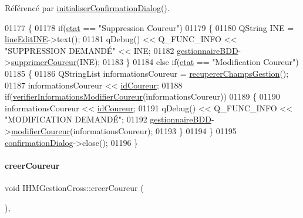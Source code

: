 Référencé par \hyperlink{class_i_h_m_gestion_cross_a1d3c7f83d4c960f38b237499d2a89731}{initialiser\+Confirmation\+Dialog()}.


\begin{DoxyCode}
01177 \{
01178     \textcolor{keywordflow}{if}(\hyperlink{class_i_h_m_gestion_cross_a5da4390d71dbd5d05cff339f93c7c85a}{etat} == \textcolor{stringliteral}{"Suppression Coureur"})
01179     \{
01180         QString INE = \hyperlink{class_i_h_m_gestion_cross_ab6c32fd079f81c4fa0b9ec0b4ef9bb61}{lineEditINE}->text();
01181         qDebug() << Q\_FUNC\_INFO << \textcolor{stringliteral}{"SUPPRESSION DEMANDÉ"} << INE;
01182         \hyperlink{class_i_h_m_gestion_cross_a440bac63a3e51db3e2c08e883f8cafc9}{gestionnaireBDD}->\hyperlink{class_gestion_b_d_d_afe47ec92274b7998131c5d4e6551d177}{supprimerCoureur}(INE);
01183     \}
01184     \textcolor{keywordflow}{else} \textcolor{keywordflow}{if}(\hyperlink{class_i_h_m_gestion_cross_a5da4390d71dbd5d05cff339f93c7c85a}{etat} == \textcolor{stringliteral}{"Modification Coureur"})
01185     \{
01186         QStringList informationsCoureur = \hyperlink{class_i_h_m_gestion_cross_a271efe8d31fbe05fccfb2dc81e71971a}{recupererChampsGestion}();
01187         informationsCoureur << \hyperlink{class_i_h_m_gestion_cross_a9352a649126c14e7d0da3694c10c3cef}{idCoureur};
01188         \textcolor{keywordflow}{if}(\hyperlink{class_i_h_m_gestion_cross_a0e088653019d8adefb371348f272d2e2}{verifierInformationsModifierCoureur}(informationsCoureur))
01189         \{
01190             informationsCoureur << \hyperlink{class_i_h_m_gestion_cross_a9352a649126c14e7d0da3694c10c3cef}{idCoureur};
01191             qDebug() << Q\_FUNC\_INFO << \textcolor{stringliteral}{"MODIFICATION DEMANDÉ"};
01192             \hyperlink{class_i_h_m_gestion_cross_a440bac63a3e51db3e2c08e883f8cafc9}{gestionnaireBDD}->\hyperlink{class_gestion_b_d_d_afad096d7e405d35a818d4858ee34df61}{modifierCoureur}(informationsCoureur);
01193         \}
01194     \}
01195     \hyperlink{class_i_h_m_gestion_cross_a417b63ff11c3be6623d17718d9058768}{confirmationDialog}->close();
01196 \}
\end{DoxyCode}
\mbox{\label{class_i_h_m_gestion_cross_a6000b152ba3febb45d6c409519168ba2}} 
\paragraph{\texorpdfstring{creer\+Coureur}{creerCoureur}}
{\footnotesize\ttfamily void I\+H\+M\+Gestion\+Cross\+::creer\+Coureur (\begin{DoxyParamCaption}{ }\end{DoxyParamCaption})\hspace{0.3cm}{\ttfamily [private]}, {\ttfamily [slot]}}



